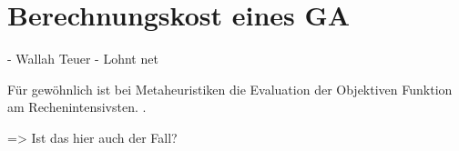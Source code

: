 \section{Berechnungskost eines GA}

- Wallah Teuer 
- Lohnt net

Für gewöhnlich ist bei Metaheuristiken die Evaluation der Objektiven Funktion am Rechenintensivsten. \cite*{MetaheuristicsEGT}.

=> Ist das hier auch der Fall?